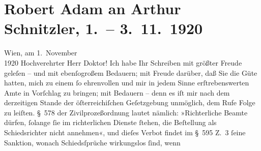 

               \section[Robert Adam an Arthur Schnitzler, 1. – 3. 11. 1920]{ Robert Adam an Arthur Schnitzler, 1. – 3. 11. 1920}\nopagebreak{}\rehead{ }\begin{ledgroupsized}[t]{13cm}\normalsize\beginnumbering{} \toendnotes[C]{\smallbreak\pagebreak[2]} 
\toendnotes[C]{\smallbreak}\pstart
           \raggedleft{}{\pb}Wien, am 1. November{\\}1920\pend
           \pstart\center{}Hochverehrter Herr Doktor!\pend\pstart
           Ich habe Ihr Schreiben mit größter Freude geleſen – und mit ebenſogroßem
                    Bedauern; mit Freude darüber, daß Sie die Güte hatten, mich zu einem ſo
                    ehrenvollen und mir in jedem Sinne erſtrebenswerten Amte in Vorſchlag zu
                    bringen; mit Bedauern – denn es iſt mir nach dem derzeitigen Stande der
                    öſterreichiſchen Geſetzgebung unmöglich, dem Rufe Folge zu leiſten. § 578 der
                    Zivilprozeßordnung lautet nämlich: »Richterliche Beamte dürfen, ſolange ſie im
                    richterlichen Dienste ſtehen, die Beſtellung als Schiedsrichter nicht annehmen«,
                    und dieſes Verbot findet im § 595 Z. 3 ſeine Sanktion, wonach Schiedsſprüche
                        wirkungs{\pb}los ſind, wenn

\end{ledgroupsized}
